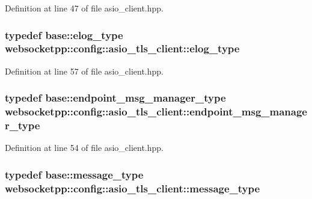 Definition at line 47 of file asio\+\_\+client.\+hpp.

\hypertarget{structwebsocketpp_1_1config_1_1asio__tls__client_a3d1c84bbdde66356494584dd9ea5818c}{}
\subsubsection[{elog\+\_\+type}]{\setlength{\rightskip}{0pt plus 5cm}typedef {\bf base\+::elog\+\_\+type} {\bf websocketpp\+::config\+::asio\+\_\+tls\+\_\+client\+::elog\+\_\+type}}\label{structwebsocketpp_1_1config_1_1asio__tls__client_a3d1c84bbdde66356494584dd9ea5818c}


Definition at line 57 of file asio\+\_\+client.\+hpp.

\hypertarget{structwebsocketpp_1_1config_1_1asio__tls__client_aeced2a30e2fe4f66d9c79c9e02dc6574}{}
\subsubsection[{endpoint\+\_\+msg\+\_\+manager\+\_\+type}]{\setlength{\rightskip}{0pt plus 5cm}typedef {\bf base\+::endpoint\+\_\+msg\+\_\+manager\+\_\+type} {\bf websocketpp\+::config\+::asio\+\_\+tls\+\_\+client\+::endpoint\+\_\+msg\+\_\+manager\+\_\+type}}\label{structwebsocketpp_1_1config_1_1asio__tls__client_aeced2a30e2fe4f66d9c79c9e02dc6574}


Definition at line 54 of file asio\+\_\+client.\+hpp.

\hypertarget{structwebsocketpp_1_1config_1_1asio__tls__client_a3e879905aed676bdda6dce35f5d6956c}{}
\subsubsection[{message\+\_\+type}]{\setlength{\rightskip}{0pt plus 5cm}typedef {\bf base\+::message\+\_\+type} {\bf websocketpp\+::config\+::asio\+\_\+tls\+\_\+client\+::message\+\_\+type}}\label{structwebsocketpp_1_1config_1_1asio__tls__client_a3e879905aed676bdda6dce35f5d6956c}


